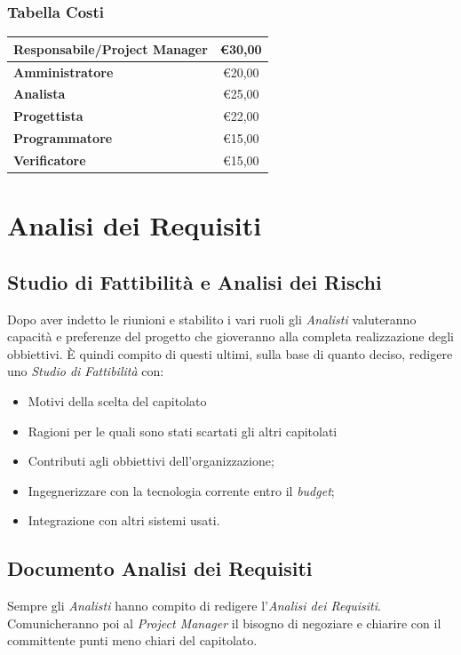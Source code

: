 \documentclass[12pt,a4paper,titlepage]{article}
\begin{document}
\subsubsection{Tabella Costi}
{\renewcommand\arraystretch{1.2}  %
	\begin{tabular}{|l|c|}
		\hline
		\textbf{Responsabile/Project Manager} & \euro 30,00 \\
		\hline
		\textbf{Amministratore} & \euro 20,00 \\
		\hline
		\textbf{Analista} & \euro 25,00 \\
		\hline
		\textbf{Progettista} & \euro 22,00 \\
		\hline
		\textbf{Programmatore} & \euro 15,00 \\
		\hline
		\textbf{Verificatore} & \euro 15,00 \\
		\hline
\end{tabular}}
\vspace{0.5cm}
\newpage
{}
\section{Analisi dei Requisiti}
\subsection{Studio di Fattibilità e Analisi dei Rischi}
Dopo aver indetto le riunioni e stabilito i vari ruoli gli \textit{Analisti} valuteranno capacità e preferenze del progetto che gioveranno alla completa realizzazione degli obbiettivi. È quindi compito di questi ultimi, sulla base di quanto deciso, redigere uno \textit{Studio di Fattibilità} con:
\begin{itemize}
	\item Motivi della scelta del capitolato
	\item Ragioni per le quali sono stati scartati gli altri capitolati
	\item Contributi agli obbiettivi dell'organizzazione;
	\item Ingegnerizzare con la tecnologia corrente entro il \textit{budget};
	\item Integrazione con altri sistemi usati.
\end{itemize}
\subsection{Documento Analisi dei Requisiti}
Sempre gli \textit{Analisti} hanno compito di redigere l'\textit{Analisi dei Requisiti}. Comunicheranno poi al \textit{Project Manager} il bisogno di negoziare e chiarire con il committente punti meno chiari del capitolato.
\end{document}
